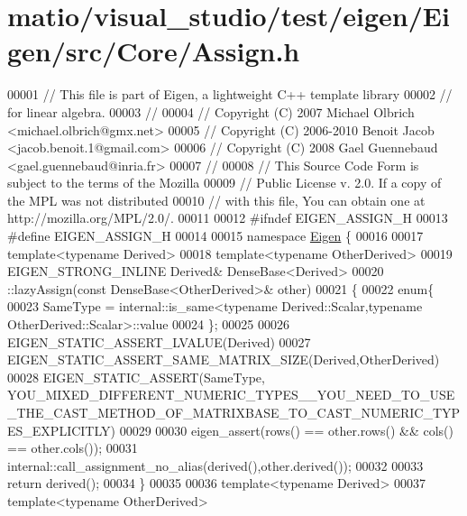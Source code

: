 \hypertarget{matio_2visual__studio_2test_2eigen_2_eigen_2src_2_core_2_assign_8h_source}{}\section{matio/visual\+\_\+studio/test/eigen/\+Eigen/src/\+Core/\+Assign.h}
\label{matio_2visual__studio_2test_2eigen_2_eigen_2src_2_core_2_assign_8h_source}

\begin{DoxyCode}
00001 \textcolor{comment}{// This file is part of Eigen, a lightweight C++ template library}
00002 \textcolor{comment}{// for linear algebra.}
00003 \textcolor{comment}{//}
00004 \textcolor{comment}{// Copyright (C) 2007 Michael Olbrich <michael.olbrich@gmx.net>}
00005 \textcolor{comment}{// Copyright (C) 2006-2010 Benoit Jacob <jacob.benoit.1@gmail.com>}
00006 \textcolor{comment}{// Copyright (C) 2008 Gael Guennebaud <gael.guennebaud@inria.fr>}
00007 \textcolor{comment}{//}
00008 \textcolor{comment}{// This Source Code Form is subject to the terms of the Mozilla}
00009 \textcolor{comment}{// Public License v. 2.0. If a copy of the MPL was not distributed}
00010 \textcolor{comment}{// with this file, You can obtain one at http://mozilla.org/MPL/2.0/.}
00011 
00012 \textcolor{preprocessor}{#ifndef EIGEN\_ASSIGN\_H}
00013 \textcolor{preprocessor}{#define EIGEN\_ASSIGN\_H}
00014 
00015 \textcolor{keyword}{namespace }\hyperlink{namespace_eigen}{Eigen} \{
00016 
00017 \textcolor{keyword}{template}<\textcolor{keyword}{typename} Derived>
00018 \textcolor{keyword}{template}<\textcolor{keyword}{typename} OtherDerived>
00019 EIGEN\_STRONG\_INLINE Derived& DenseBase<Derived>
00020   ::lazyAssign(\textcolor{keyword}{const} DenseBase<OtherDerived>& other)
00021 \{
00022   \textcolor{keyword}{enum}\{
00023     SameType = internal::is\_same<typename Derived::Scalar,typename OtherDerived::Scalar>::value
00024   \};
00025 
00026   EIGEN\_STATIC\_ASSERT\_LVALUE(Derived)
00027   EIGEN\_STATIC\_ASSERT\_SAME\_MATRIX\_SIZE(Derived,OtherDerived)
00028   EIGEN\_STATIC\_ASSERT(SameType,
      YOU\_MIXED\_DIFFERENT\_NUMERIC\_TYPES\_\_YOU\_NEED\_TO\_USE\_THE\_CAST\_METHOD\_OF\_MATRIXBASE\_TO\_CAST\_NUMERIC\_TYPES\_EXPLICITLY)
00029 
00030   eigen\_assert(rows() == other.rows() && cols() == other.cols());
00031   internal::call\_assignment\_no\_alias(derived(),other.derived());
00032   
00033   \textcolor{keywordflow}{return} derived();
00034 \}
00035 
00036 \textcolor{keyword}{template}<\textcolor{keyword}{typename} Derived>
00037 \textcolor{keyword}{template}<\textcolor{keyword}{typename} OtherDerived>

\end{DoxyCode}
